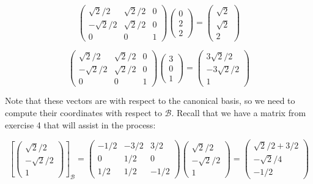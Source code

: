 \documentclass[11pt]{article}
\begin{document}
$$\begin{pmatrix}
\sqrt{2}/2 &\sqrt{2}/2 &0 \\ -\sqrt{2}/2 & \sqrt{2}/2 & 0\\ 0&0&1
\end{pmatrix}\begin{pmatrix}
0\\2\\2
\end{pmatrix} = \begin{pmatrix}
\sqrt{2} \\ \sqrt{2} \\ 2
\end{pmatrix}$$

$$\begin{pmatrix}
\sqrt{2}/2 &\sqrt{2}/2 &0 \\ -\sqrt{2}/2 & \sqrt{2}/2 & 0\\ 0&0&1
\end{pmatrix}\begin{pmatrix}
3\\0\\1
\end{pmatrix} = \begin{pmatrix}
3\sqrt{2}/2 \\ -3\sqrt{2}/2 \\ 1
\end{pmatrix}$$

Note that these vectors are with respect to the canonical basis, so we need to compute their coordinates with respect to $\mathcal{B}$. Recall that we have a matrix from exercise 4 that will assist in the process:

$$\left[\begin{pmatrix}
\sqrt{2}/2 \\ -\sqrt{2}/2 \\ 1
\end{pmatrix}\right]_{\mathcal{B}} = 
\begin{pmatrix}
-1/2&-3/2&3/2\\0&1/2&0\\1/2&1/2&-1/2
\end{pmatrix}\begin{pmatrix}
\sqrt{2}/2 \\ -\sqrt{2}/2 \\ 1
\end{pmatrix} = \begin{pmatrix}
\sqrt{2}/2+3/2 \\ -\sqrt{2}/4 \\- 1/2
\end{pmatrix}$$
\end{document}
